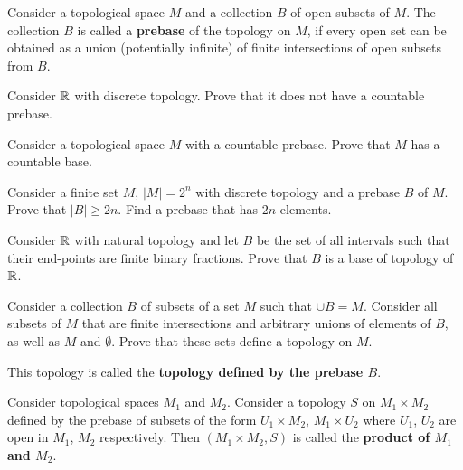\documentclass[12pt]{article}
\begin{document}



\begin{opredelenie}
  Consider a topological space $M$ and a collection $B$ of open
  subsets of $M$. The collection $B$ is called a {\bf prebase} of the
  topology on $M$, if every open set can be obtained as a union
  (potentially infinite) of finite intersections of open subsets from
  $B$.
\end{opredelenie}

\begin{zadacha} Consider ${\mathbb R}$ with discrete topology. Prove that it
  does not have a countable prebase.
\end{zadacha}

\begin{zadacha}[!]\label{count}
  Consider a topological space $M$ with a countable prebase. Prove that
  $M$ has a countable base.
\end{zadacha}

\begin{zadacha}[*]
Consider a finite set $M$, $|M|=2^n$ with discrete topology and a
prebase $B$ of $M$. Prove that $|B| \geq 2n$. Find a prebase that has
$2n$ elements.
\end{zadacha}

\begin{zadacha} 
  Consider ${\mathbb R}$ with natural topology and let $B$ be the set of all
  intervals such that their end-points are finite binary
  fractions. Prove that $B$ is a base of topology of ${\mathbb R}$.
\end{zadacha}

\begin{zadacha}
  Consider a collection $B$ of subsets of a set $M$ such that $\cup B=M$.
  Consider all subsets of $M$ that are finite intersections and
  arbitrary unions of elements of $B$, as well as $M$ and $\emptyset$.
  Prove that these sets define a topology on $M$.
\end{zadacha}

\begin{opredelenie}
  This topology is called the {\bf topology defined by the prebase $B$}.
\end{opredelenie}

\begin{opredelenie}
  Consider topological spaces $M_1$ and $M_2$. Consider a topology $S$
  on $M_1 \times M_2$ defined by the prebase of subsets of the form
  $U_1\times M_2$, $M_1\times U_2$ where $U_1$, $U_2$ are open in
  $M_1$, $M_2$ respectively. Then $(M_1\times M_2, S)$ is called the
  {\bf product of $M_1$ and $M_2$}.
\end{opredelenie}
\end{document}
